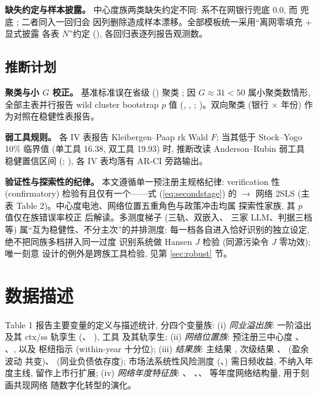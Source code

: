 \textbf{缺失约定与样本披露。} 中心度族两类缺失约定不同:
 系不在网银行兜底 0.0, 而
 兜底 ; 二者同入一回归会
因列删除造成样本漂移。全部模板统一采用``离网零填充 + 显式披露
各表 $N$''约定 (),
各回归表逐列报告观测数。

\subsection{推断计划}\label{subsec:inference}

\textbf{聚类与小 $G$ 校正。} 基准标准误在省级
() 聚类 \parencite{cameron2015practitioner}; 因
$G \approx 31 < 50$ 属小聚类数情形, 全部主表并行报告 wild
cluster bootstrap $p$ 值 (,
, ;
\parencite{roodman2019fast})。双向聚类 (银行 $\times$ 年份)
作为对照在稳健性表报告。

\textbf{弱工具规则。} 各 IV 表报告 Kleibergen--Paap rk Wald $F$;
当其低于 Stock--Yogo 10\% 临界值 (单工具 16.38, 双工具 19.93)
时, 推断改读 Anderson--Rubin 弱工具稳健置信区间
(; \parencite{andrews2019weak}), 各 IV 表均落有
AR-CI 旁路输出。

\textbf{验证性与探索性的纪律。} 本文遵循单一预注册主规格纪律:
verification 性 (confirmatory) 检验有且仅有一个——式
(\ref{eq:secondstage}) 的
 $\to$  网络 2SLS
(主表 Table 2)。中心度电池、网络位置五重角色与政策冲击均属
探索性家族, 其 $p$ 值仅在族错误率校正
\parencite{romano2005stepwise} 后解读。多测度梯子 (三轨、双嵌入、
三家 LLM、判据三档等) 属``互为稳健性、不分主次''的并排测度:
每一档各自进入恰好识别的独立设定, 绝不把同族多档拼入同一过度
识别系统做 Hansen $J$ 检验 (同源污染令 $J$ 零功效); 唯一刻意
设计的例外是跨族工具检验, 见第 \ref{sec:robust} 节。

\section{数据描述}\label{sec:data}

Table 1 报告主要变量的定义与描述统计, 分四个变量族:
(i) \emph{同业溢出族}: 一阶溢出 
及其 ctx/ss 轨孪生 (、
), 工具 
及其轨孪生;
(ii) \emph{网络位置族}: 预注册三中心度 、
、, 以及
枢纽指示  (within-year 十分位);
(iii) \emph{结果族}: 主结果 , 次级结果
、 (盈余波动
共变)、 (同业负债依存度);
市场法系统性风险测度 (、)
需日频收益, 不纳入年度主线, 留作上市行扩展;
(iv) \emph{网络年度特征族}: 、
、、
 等年度网络结构量, 用于刻画共现网络
随数字化转型的演化。

